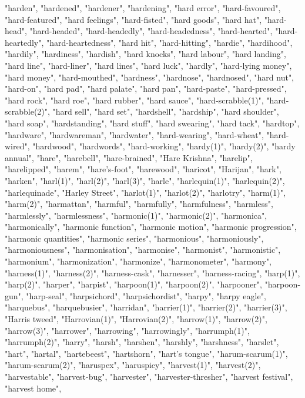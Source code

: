"harden",
"hardened",
"hardener",
"hardening",
"hard error",
"hard-favoured",
"hard-featured",
"hard feelings",
"hard-fisted",
"hard goods",
"hard hat",
"hard-head",
"hard-headed",
"hard-headedly",
"hard-headedness",
"hard-hearted",
"hard-heartedly",
"hard-heartedness",
"hard hit",
"hard-hitting",
"hardie",
"hardihood",
"hardily",
"hardiness",
"hardish",
"hard knocks",
"hard labour",
"hard landing",
"hard line",
"hard-liner",
"hard lines",
"hard luck",
"hardly",
"hard-lying money",
"hard money",
"hard-mouthed",
"hardness",
"hardnose",
"hardnosed",
"hard nut",
"hard-on",
"hard pad",
"hard palate",
"hard pan",
"hard-paste",
"hard-pressed",
"hard rock",
"hard roe",
"hard rubber",
"hard sauce",
"hard-scrabble(1)",
"hard-scrabble(2)",
"hard sell",
"hard set",
"hardshell",
"hardship",
"hard shoulder",
"hard soap",
"hardstanding",
"hard stuff",
"hard swearing",
"hard tack",
"hardtop",
"hardware",
"hardwareman",
"hardwater",
"hard-wearing",
"hard-wheat",
"hard-wired",
"hardwood",
"hardwords",
"hard-working",
"hardy(1)",
"hardy(2)",
"hardy annual",
"hare",
"harebell",
"hare-brained",
"Hare Krishna",
"harelip",
"harelipped",
"harem",
"hare's-foot",
"harewood",
"haricot",
"Harijan",
"hark",
"harken",
"harl(1)",
"harl(2)",
"harl(3)",
"harle",
"harlequin(1)",
"harlequin(2)",
"harlequinade",
"Harley Street",
"harlot(1)",
"harlot(2)",
"harlotry",
"harm(1)",
"harm(2)",
"harmattan",
"harmful",
"harmfully",
"harmfulness",
"harmless",
"harmlessly",
"harmlessness",
"harmonic(1)",
"harmonic(2)",
"harmonica",
"harmonically",
"harmonic function",
"harmonic motion",
"harmonic progression",
"harmonic quantities",
"harmonic series",
"harmonious",
"harmoniously",
"harmoniousness",
"harmonisation",
"harmonise",
"harmonist",
"harmonistic",
"harmonium",
"harmonization",
"harmonize",
"harmonometer",
"harmony",
"harness(1)",
"harness(2)",
"harness-cask",
"harnesser",
"harness-racing",
"harp(1)",
"harp(2)",
"harper",
"harpist",
"harpoon(1)",
"harpoon(2)",
"harpooner",
"harpoon-gun",
"harp-seal",
"harpsichord",
"harpsichordist",
"harpy",
"harpy eagle",
"harquebus",
"harquebusier",
"harridan",
"harrier(1)",
"harrier(2)",
"harrier(3)",
"Harris tweed",
"Harrovian(1)",
"Harrovian(2)",
"harrow(1)",
"harrow(2)",
"harrow(3)",
"harrower",
"harrowing",
"harrowingly",
"harrumph(1)",
"harrumph(2)",
"harry",
"harsh",
"harshen",
"harshly",
"harshness",
"harslet",
"hart",
"hartal",
"hartebeest",
"hartshorn",
"hart's tongue",
"harum-scarum(1)",
"harum-scarum(2)",
"haruspex",
"haruspicy",
"harvest(1)",
"harvest(2)",
"harvestable",
"harvest-bug",
"harvester",
"harvester-thresher",
"harvest festival",
"harvest home",
